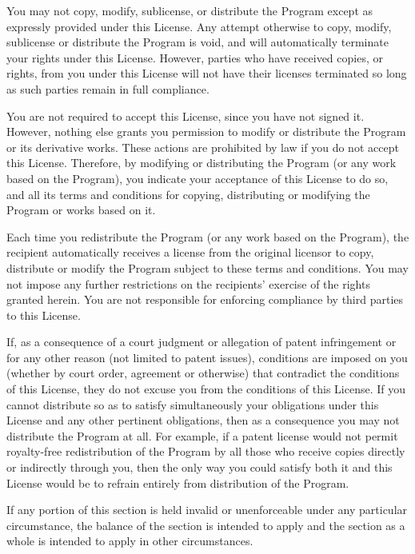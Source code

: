 \begin{DoxyEnumerate}
\item You may not copy, modify, sublicense, or distribute the Program except as expressly provided under this License. Any attempt otherwise to copy, modify, sublicense or distribute the Program is void, and will automatically terminate your rights under this License. However, parties who have received copies, or rights, from you under this License will not have their licenses terminated so long as such parties remain in full compliance.
\item You are not required to accept this License, since you have not signed it. However, nothing else grants you permission to modify or distribute the Program or its derivative works. These actions are prohibited by law if you do not accept this License. Therefore, by modifying or distributing the Program (or any work based on the Program), you indicate your acceptance of this License to do so, and all its terms and conditions for copying, distributing or modifying the Program or works based on it.
\item Each time you redistribute the Program (or any work based on the Program), the recipient automatically receives a license from the original licensor to copy, distribute or modify the Program subject to these terms and conditions. You may not impose any further restrictions on the recipients' exercise of the rights granted herein. You are not responsible for enforcing compliance by third parties to this License.
\item If, as a consequence of a court judgment or allegation of patent infringement or for any other reason (not limited to patent issues), conditions are imposed on you (whether by court order, agreement or otherwise) that contradict the conditions of this License, they do not excuse you from the conditions of this License. If you cannot distribute so as to satisfy simultaneously your obligations under this License and any other pertinent obligations, then as a consequence you may not distribute the Program at all. For example, if a patent license would not permit royalty-\/free redistribution of the Program by all those who receive copies directly or indirectly through you, then the only way you could satisfy both it and this License would be to refrain entirely from distribution of the Program.
\end{DoxyEnumerate}

If any portion of this section is held invalid or unenforceable under any particular circumstance, the balance of the section is intended to apply and the section as a whole is intended to apply in other circumstances.

